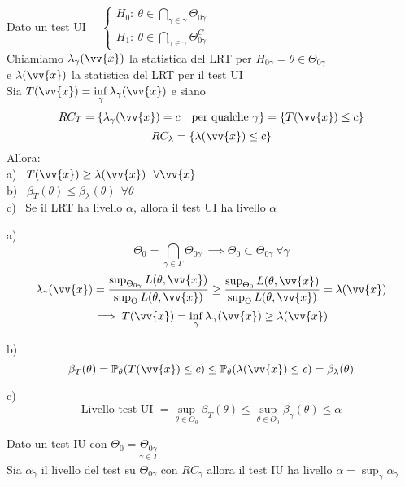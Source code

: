\begin{teo}
Dato un test UI \ \ $\begin{cases}
    H_0 : \ \theta\in \underset{\gamma\in\gamma}{\bigcap} \Theta_{0\gamma}\\
    H_1 : \ \theta\in \underset{\gamma\in\gamma}{\bigcap} \Theta_{0\gamma}^C
\end{cases}$\\
Chiamiamo $\lambda_{\gamma}(\vv{x})$ la statistica del LRT per $H_{0\gamma}=\theta\in\Theta_{0\gamma}$\\
e $\lambda(\vv{x})$ la statistica del LRT per il test UI\\
Sia $T(\vv{x})=\displaystyle\inf_{\gamma} \lambda_{\gamma}(\vv{x})$ e siano
    \[
    RC_T = \{ \lambda_{\gamma}(\vv{x})=c \ \ \text{ per qualche } \gamma\} = \{T(\vv{x})\le c\}
    \]
    \[
    RC_{\lambda}=\{\lambda(\vv{x})\le c\}
    \]
    Allora:\\
    a) \ $T(\vv{x})\ge \lambda(\vv{x}) \ \ \forall \vv{x}$\\
    b) \ $\beta_T(\theta)\le \beta_{\lambda}(\theta) \ \ \forall\theta$\\
    c) \ Se il LRT ha livello $\alpha$, allora il test UI ha livello $\alpha$
\end{teo}

\begin{Dim}
    a)
    \[
    \Theta_0=\underset{\gamma\in\Gamma}{\bigcap} \Theta_{0\gamma} \ \implies \Theta_0 \subset \Theta_{0\gamma} \ \forall\gamma
    \]
    \[
    \lambda_{\gamma}(\vv{x})= \frac{\sup_{\Theta_{0\gamma}}L(\theta,\vv{x})}{\sup_{\Theta}L(\theta,\vv{x})} \ge  \frac{\sup_{\Theta_0}L(\theta,\vv{x})}{\sup_{\Theta}L(\theta,\vv{x})} = \lambda(\vv{x}) 
    \] 
    \[
    \implies T(\vv{x}) = \inf_{\gamma}\lambda_{\gamma}(\vv{x})\ge \lambda(\vv{x})
    \]

    b)
    \[
    \beta_T(\theta)=\PP_{\theta}(T(\vv{x})\le c) \le \PP_{\theta}(\lambda(\vv{x})\le c) = \beta_{\lambda}(\theta)
    \]

    c)
    \[
    \text{Livello test UI } = \sup_{\theta\in\Theta_0}\beta_T(\theta) \le \sup_{\theta\in\Theta_0} \beta_{\gamma}(\theta)\le\alpha
    \]
\end{Dim}

\begin{teo}
Dato un test IU con $\Theta_0 = \underset{\gamma\in\Gamma}{\Theta_{0\gamma}}$\\
Sia $\alpha_{\gamma}$ il livello del test su $\Theta_{0\gamma}$ con $RC_{\gamma}$ allora il test IU ha livello $\alpha= \displaystyle\sup_{\gamma} \alpha_{\gamma}$
\end{teo}

